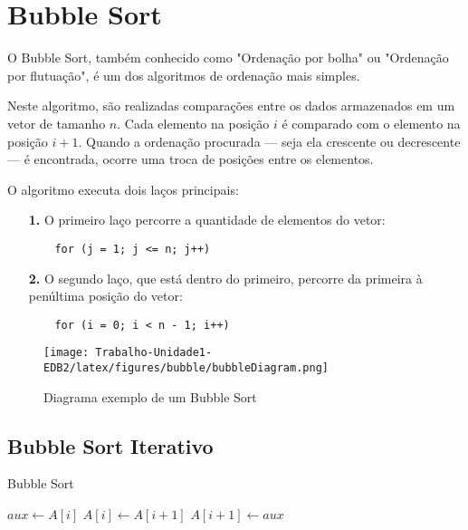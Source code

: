\section{Bubble Sort}
\label{sec:bubble_sort_teo}

O Bubble Sort, também conhecido como "Ordenação por bolha" ou "Ordenação por flutuação", é um dos algoritmos de ordenação mais simples.

Neste algoritmo, são realizadas comparações entre os dados armazenados em um vetor de tamanho \( n \). Cada elemento na posição \( i \) é comparado com o elemento na posição \( i+1 \). Quando a ordenação procurada — seja ela crescente ou decrescente — é encontrada, ocorre uma troca de posições entre os elementos.

O algoritmo executa dois laços principais:

\begin{enumerate}
    \item[\textbf{1.}] O primeiro laço percorre a quantidade de elementos do vetor:
    \begin{verbatim}
    for (j = 1; j <= n; j++)
    \end{verbatim}
    
    \item[\textbf{2.}] O segundo laço, que está dentro do primeiro, percorre da primeira à penúltima posição do vetor:
    \begin{verbatim}
    for (i = 0; i < n - 1; i++)
    \end{verbatim}
\end{enumerate}


\begin{figure}[!ht]
	\centering
	\texttt{[image: Trabalho-Unidade1-EDB2/latex/figures/bubble/bubbleDiagram.png]}
	\caption{Diagrama exemplo de um Bubble Sort}
	\label{fig:merge_sort_example_0}
\end{figure}


\FloatBarrier

\newpage

\subsection{Bubble Sort Iterativo}

\begin{algorithm}
    \caption{Bubble Sort}
    \label{algo:bubble_sort}
    \begin{algorithmic}[1]
        \Statex
                    \State $aux \gets A[i]$ 
                    \State $A[i] \gets A[i + 1]$ 
                    \State $A[i + 1] \gets aux$ 
                \EndIf
            \EndFor
        \EndFor
        \EndFunction
    \end{algorithmic}
\end{algorithm}

